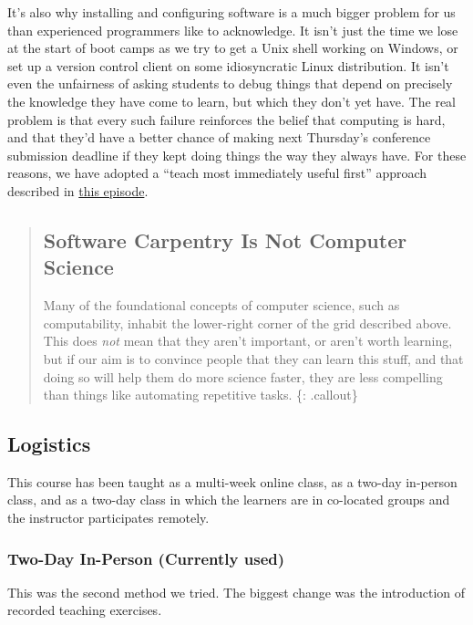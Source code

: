 It's also why installing and configuring software is a much bigger
problem for us than experienced programmers like to acknowledge. It
isn't just the time we lose at the start of boot camps as we try to get
a Unix shell working on Windows, or set up a version control client on
some idiosyncratic Linux distribution. It isn't even the unfairness of
asking students to debug things that depend on precisely the knowledge
they have come to learn, but which they don't yet have. The real problem
is that every such failure reinforces the belief that computing is hard,
and that they'd have a better chance of making next Thursday's
conference submission deadline if they kept doing things the way they
always have. For these reasons, we have adopted a ``teach most
immediately useful first'' approach described in
\href{\{\{\%20page.root\%20\}\}/19-motivation/}{this episode}.

\begin{quote}
\subsection{Software Carpentry Is Not Computer
Science}\label{software-carpentry-is-not-computer-science}

Many of the foundational concepts of computer science, such as
computability, inhabit the lower-right corner of the grid described
above. This does \emph{not} mean that they aren't important, or aren't
worth learning, but if our aim is to convince people that they can learn
this stuff, and that doing so will help them do more science faster,
they are less compelling than things like automating repetitive tasks.
\{: .callout\}
\end{quote}

\subsection{Logistics}\label{logistics}

This course has been taught as a multi-week online class, as a two-day
in-person class, and as a two-day class in which the learners are in
co-located groups and the instructor participates remotely.

\subsubsection{Two-Day In-Person (Currently
used)}\label{two-day-in-person-currently-used}

This was the second method we tried. The biggest change was the
introduction of recorded teaching exercises.

